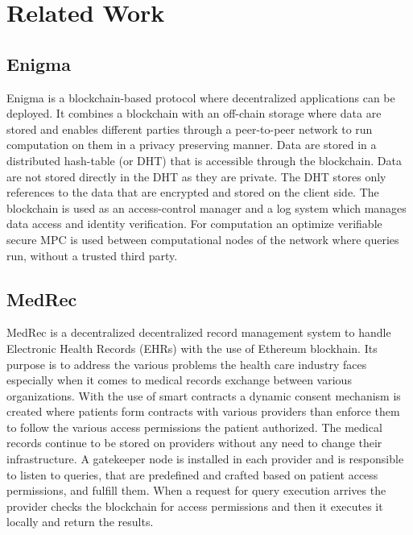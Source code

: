 \chapter{Related Work}
\label{related_work}

\section{Enigma}
\label{rel_work:enigma}

Enigma is a blockchain-based protocol where decentralized applications can be deployed. It combines a blockchain with an off-chain storage where data are stored and enables different parties through a peer-to-peer network to run computation on them in a privacy preserving manner. Data are stored in a distributed hash-table (or DHT) that is accessible through the blockchain. Data are not stored directly in the DHT as they are private. The DHT stores only references to the data that are encrypted and stored on the client side. The blockchain is used as an access-control manager and a log system which manages data access and identity verification. For computation an optimize verifiable secure MPC is used between computational nodes of the network where queries run, without a trusted third party.

\section{MedRec}
\label{rel_work:medrec}

MedRec is a decentralized decentralized record management system to handle Electronic Health Records (EHRs) with the use of Ethereum blockhain. Its purpose is to address the various problems the health care industry faces especially when it comes to medical records exchange between various organizations. With the use of smart contracts a dynamic consent mechanism is created where patients form contracts with various providers than enforce them to follow the various access permissions the patient authorized. The medical records continue to be stored on providers without any need to change their infrastructure. A gatekeeper node is installed in each provider and is responsible to listen to queries, that are predefined and crafted based on patient access permissions, and fulfill them. When a request for query execution arrives the provider checks the blockchain for access permissions and then it executes it locally and return the results.
